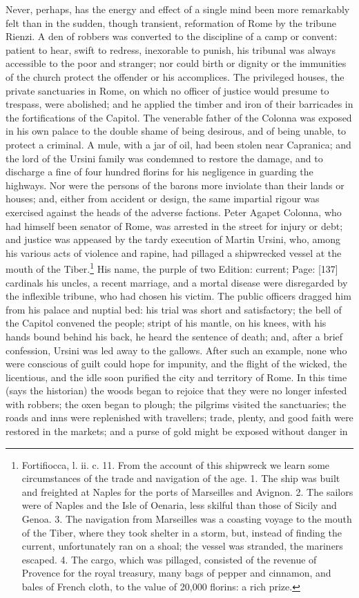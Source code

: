 Never, perhaps, has the energy and effect of a single mind been more remarkably felt than in the sudden, though transient, reformation of Rome by the tribune Rienzi. A den of robbers was converted to the discipline of a camp or convent: patient to hear, swift to redress, inexorable to punish, his tribunal was always accessible to the poor and stranger; nor could birth or dignity or the immunities of the church protect the offender or his accomplices. The privileged houses, the private sanctuaries in Rome, on which no officer of justice would presume to trespass, were abolished; and he applied the timber and iron of their barricades in the fortifications of the Capitol. The venerable father of the Colonna was exposed in his own palace to the double shame of being desirous, and of being unable, to protect a criminal. A mule, with a jar of oil, had been stolen near Capranica; and the lord of the Ursini family was condemned to restore the damage, and to discharge a fine of four hundred florins for his negligence in guarding the highways. Nor were the persons of the barons more inviolate than their lands or houses; and, either from accident or design, the same impartial rigour was exercised against the heads of the adverse factions. Peter Agapet Colonna, who had himself been senator of Rome, was arrested in the street for injury or debt; and justice was appeased by the tardy execution of Martin Ursini, who, among his various acts of violence and rapine, had pillaged a shipwrecked vessel at the mouth of the Tiber.\footnote{Fortifiocca, l. ii. c. 11. From the account of this shipwreck we learn some circumstances of the trade and navigation of the age. 1. The ship was built and freighted at Naples for the ports of Marseilles and Avignon. 2. The sailors were of Naples and the Isle of Oenaria, less skilful than those of Sicily and Genoa. 3. The navigation from Marseilles was a coasting voyage to the mouth of the Tiber, where they took shelter in a storm, but, instead of finding the current, unfortunately ran on a shoal; the vessel was stranded, the mariners escaped. 4. The cargo, which was pillaged, consisted of the revenue of Provence for the royal treasury, many bags of pepper and cinnamon, and bales of French cloth, to the value of 20,000 florins: a rich prize.} His name, the purple of two Edition: current; Page: [137] cardinals his uncles, a recent marriage, and a mortal disease were disregarded by the inflexible tribune, who had chosen his victim. The public officers dragged him from his palace and nuptial bed: his trial was short and satisfactory; the bell of the Capitol convened the people; stript of his mantle, on his knees, with his hands bound behind his back, he heard the sentence of death; and, after a brief confession, Ursini was led away to the gallows. After such an example, none who were conscious of guilt could hope for impunity, and the flight of the wicked, the licentious, and the idle soon purified the city and territory of Rome. In this time (says the historian) the woods began to rejoice that they were no longer infested with robbers; the oxen began to plough; the pilgrims visited the sanctuaries; the roads and inns were replenished with travellers; trade, plenty, and good faith were restored in the markets; and a purse of gold might be exposed without danger in 